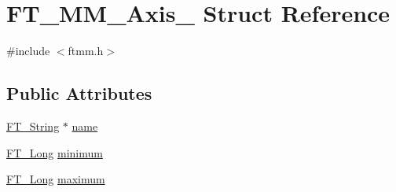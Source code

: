 \hypertarget{struct_f_t___m_m___axis__}{\section{F\-T\-\_\-\-M\-M\-\_\-\-Axis\-\_\- Struct Reference}
\label{struct_f_t___m_m___axis__}
}


{\ttfamily \#include $<$ftmm.\-h$>$}

\subsection*{Public Attributes}
\begin{DoxyCompactItemize}
\item 
\hyperlink{fttypes_8h_a9846214585359eb2ba6bbb0e6de30639}{F\-T\-\_\-\-String} $\ast$ \hyperlink{struct_f_t___m_m___axis___a5c784efa44906c0e2b715eb1f866a09f}{name}
\item 
\hyperlink{fttypes_8h_a7fa72a1f0e79fb1860c5965789024d6f}{F\-T\-\_\-\-Long} \hyperlink{struct_f_t___m_m___axis___a9dc31f02b350b1356e0896673b5b73a4}{minimum}
\item 
\hyperlink{fttypes_8h_a7fa72a1f0e79fb1860c5965789024d6f}{F\-T\-\_\-\-Long} \hyperlink{struct_f_t___m_m___axis___addac1f8e71da1bedea9b393ae2751881}{maximum}
\end{DoxyCompactItemize}


